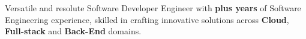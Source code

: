 \vspace{\SpacerAboveTopic}
\item{Versatile and resolute Software Developer Engineer with {\color{BrickRed}\textbf{{\YearsOfExperience} plus years}}  of Software Engineering experience, skilled in crafting innovative solutions across \textbf{Cloud}, \textbf{Full-stack} and \textbf{Back-End} domains.}
\vspace{\SpacerBelowTopic}
